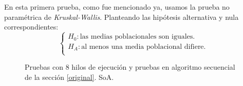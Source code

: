 \documentclass{article}
\begin{document}
En esta primera prueba, como fue mencionado ya, usamos la prueba no paramétrica de \textit{Kruskal-Wallis}. Planteando
las hipótesis alternativa y nula correspondientes:
\begin{displaymath}
\begin{cases}
	{H_0}: \text{las medias poblacionales son iguales.}\\
	{H_A}: \text{al menos una media poblacional difiere.}\\
\end{cases}
\end{displaymath}
\begin{figure}[htp]
	\hspace*{-3.5cm}
	\caption{Pruebas con 8 hilos de ejecución y pruebas en algoritmo secuencial de la sección \ref{original}. SoA.}
	\label{fig:8core_p_1}
\end{figure}
\end{document}

